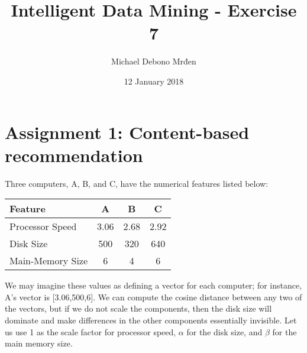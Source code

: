 \documentclass{article}
\title{Intelligent Data Mining - Exercise 7}
\author{\fontencoding{T1}\selectfont Michael Debono Mrđen}
\date{12 January 2018}
\begin{document}
\maketitle

\section{Assignment 1: Content-based recommendation}
\renewcommand{\labelenumi}{\alph{enumi}.}
\renewcommand{\labelenumii}{\arabic{enumii}.}

Three computers, A, B, and C, have the numerical features listed below:
	
	\begin{center}
		\begin{tabular}{ l | c | c | c }
			Feature          & A    & B    & C    \\ \hline
			Processor Speed  & 3.06 & 2.68 & 2.92 \\
			Disk Size        & 500  & 320  & 640  \\
			Main-Memory Size & 6    & 4    & 6
		\end{tabular}
	\end{center}

We may imagine these values as defining a vector for each computer; for instance, A's vector is
[3.06,500,6]. We can compute the cosine distance between any two of the vectors, but if we do not scale the components, then the disk size will dominate and make differences in the other components essentially invisible. Let us use 1 as the scale factor for processor speed, $\alpha$ for the disk size, and $\beta$ for the main memory size.
\end{document}

